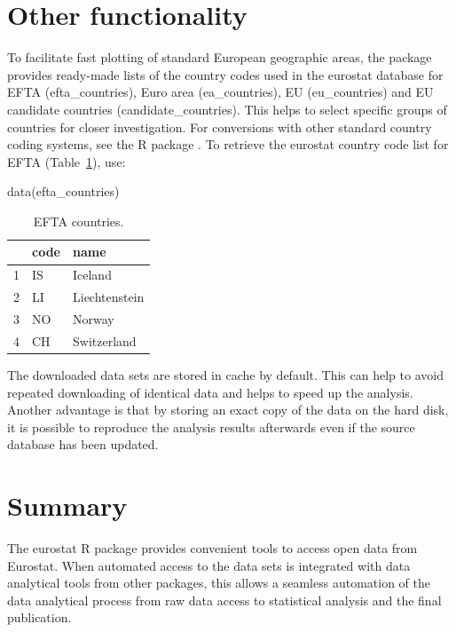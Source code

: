 \section{Other functionality}

To facilitate fast plotting of standard European geographic areas, the package provides ready-made lists of the country codes used in the eurostat database for EFTA (efta\_countries), Euro area (ea\_countries), EU (eu\_countries) and EU candidate countries (candidate\_countries). This helps to select specific groups of countries for closer investigation. For conversions with other standard country coding systems, see the  R package \citep{countrycode}. To retrieve the eurostat country code list for EFTA (Table~\ref{tab:efta}), use:

\begin{example}
data(efta_countries)
\end{example}


\begin{table}[ht]
\centering
\begin{tabular}{rll}
\toprule
  \hline
 & code & name \\ 
  \hline
  1 & IS & Iceland \\ 
  2 & LI & Liechtenstein \\ 
  3 & NO & Norway \\ 
  4 & CH & Switzerland \\ 
   \hline
\bottomrule   
\end{tabular}
\label{tab:efta}
\caption{EFTA countries.}
\end{table}


The downloaded data sets are stored in cache by default. This can help
to avoid repeated downloading of identical data and helps to speed up
the analysis. Another advantage is that by storing an exact copy of
the data on the hard disk, it is possible to reproduce the analysis
results afterwards even if the source database has been updated.



\section{Summary}

The eurostat R package provides convenient tools to access open data
from Eurostat. When automated access to the data sets is integrated
with data analytical tools from other packages, this allows a seamless
automation of the data analytical process from raw data access to
statistical analysis and the final publication.


